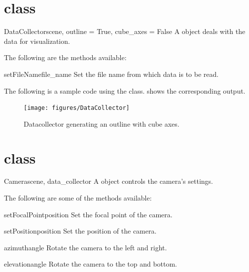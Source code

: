 \section{\DataCollector class}
\begin{classdesc}{DataCollector}{scene, outline = True, cube_axes = False}
A \DataCollector object deals with the data for visualization.
\end{classdesc}

The following are the methods available:
\begin{methoddesc}[DataCollector]{setFileName}{file_name}
Set the file name from which data is to be read.
\end{methoddesc}

The following is a sample code using the \DataCollector class. 
 shows the corresponding output. 


\begin{figure}[ht]
\begin{center}
\texttt{[image: figures/DataCollector]}
\end{center}
\caption{Datacollector generating an outline with cube axes.}
\label{fig:datacollector.1}
\end{figure}

\section{\Camera class}
\begin{classdesc}{Camera}{scene, data_collector}
A \Camera object controls the camera's settings.
\end{classdesc}

The following are some of the methods available:
\begin{methoddesc}[Camera]{setFocalPoint}{position}
Set the focal point of the camera.
\end{methoddesc}

\begin{methoddesc}[Camera]{setPosition}{position}
Set the position of the camera.
\end{methoddesc}

\begin{methoddesc}[Camera]{azimuth}{angle}
Rotate the camera to the left and right.
\end{methoddesc}

\begin{methoddesc}[Camera]{elevation}{angle}
Rotate the camera to the top and bottom.
\end{methoddesc}

